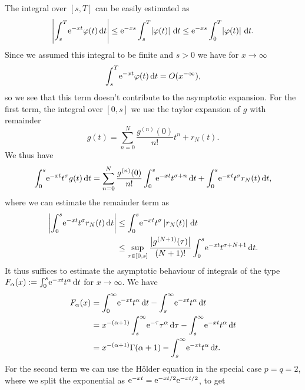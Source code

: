 \begin{Theorem}
\begin{Proof}
    The integral over $\left[s,T\right]$ can be easily estimated as
    \begin{equation*}
      \Abs{\Integ[T]{s}{t}{\Eto{-xt}\phi(t)}}
      \le \Eto{-xs} \Integ[T]{s}{t}{\Abs{\phi(t)}}
      \le \Eto{-xs}\Integ[T]{0}{t}{\Abs{\phi(t)}}.
    \end{equation*}
    Since we assumed this integral to be finite and $s>0$ we have for
    $x\to\infty$
    \begin{equation*}
      \Integ[T]st{\Eto{-xt}\phi(t)} = O(x^{-\infty}),
    \end{equation*}
    so we see that this term doesn't contribute to the asymptotic expansion.
    For the first term, the integral over $[0,s]$ we use the taylor expansion of
    $g$ with remainder
    \begin{equation*}
      g(t) = \sum_{n=0}^{N} \frac{g^{(n)}(0)}{n!}t^n + r_N(t).
    \end{equation*}
    We thus have
    \begin{equation*}
      \Integ[s]0t{\Eto{-xt}t^\sigma g(t)} = \sum_{n=0}^N
      \frac{g^{(n)}(0)}{n!} \Integ[s]0t{\Eto{-xt}t^{\sigma+n}} +
      \Integ[s]0t{\Eto{-xt}t^\sigma r_N(t)},
    \end{equation*}
    where we can estimate the remainder term as
    \begin{align*}
      \left|\Integ[s]0t{\Eto{-xt}t^\sigma r_N(t)}\right| &\le
      \Integ[s]0t{\Eto{-xt}t^\sigma\left|r_N(t)\right|} \\
      &\le \sup_{\tau\in\left[0,s\right]}
      \frac{\bigl|g^{(N+1)}(\tau)\bigr|}{(N+1)!}\Integ[s]0t{\Eto{-xt}t^{\sigma+N+1}}.
    \end{align*}
    It thus suffices to estimate the asymptotic behaviour of integrals of
    the type $F_\alpha(x) := \Integ[s]0t{\Eto{-xt}t^\alpha}$ for
    $x\to\infty$. We have
    \begin{align*}
      F_\alpha(x) &= \Integ[\infty]{0}{t}{\Eto{-xt}t^\alpha} -
      \Integ[\infty]{s}{t}{\Eto{-xt}t^\alpha} \\
      &= x^{-(\alpha+1)}\Integ[\infty]{s}{\tau}{\Eto{-\tau}\tau^\alpha} -
      \Integ[\infty]{s}{t}{\Eto{-xt}t^\alpha} \\
      &= x^{-(\alpha+1)}\Gamma(\alpha + 1) - 
      \Integ[\infty]{s}{t}{\Eto{-xt}t^\alpha}.
    \end{align*}
    For the second term we can use the Hölder equation in the special case
    $p=q=2$, where we split the exponential as $\Eto{-xt} =
    \Eto{-xt/2}\Eto{-xt/2}$, to get
    \begin{equation*}

\end{equation*}
\end{Proof}
\end{Theorem}

